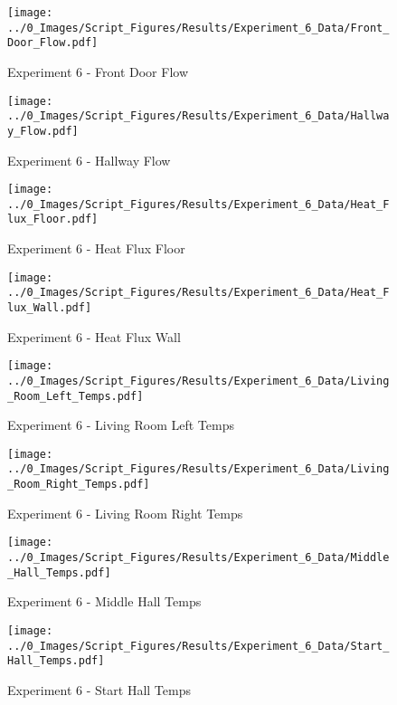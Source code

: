 	\clearpage

	\begin{figure}[H]
		\centering
		\texttt{[image: ../0\_Images/Script\_Figures/Results/Experiment\_6\_Data/Front\_Door\_Flow.pdf]}
		\caption[]{Experiment 6 - Front Door Flow}
	\end{figure}
 

	\begin{figure}[H]
		\centering
		\texttt{[image: ../0\_Images/Script\_Figures/Results/Experiment\_6\_Data/Hallway\_Flow.pdf]}
		\caption[]{Experiment 6 - Hallway Flow}
	\end{figure}
 
	\clearpage

	\begin{figure}[H]
		\centering
		\texttt{[image: ../0\_Images/Script\_Figures/Results/Experiment\_6\_Data/Heat\_Flux\_Floor.pdf]}
		\caption[]{Experiment 6 - Heat Flux Floor}
	\end{figure}
 

	\begin{figure}[H]
		\centering
		\texttt{[image: ../0\_Images/Script\_Figures/Results/Experiment\_6\_Data/Heat\_Flux\_Wall.pdf]}
		\caption[]{Experiment 6 - Heat Flux Wall}
	\end{figure}
 
	\clearpage

	\begin{figure}[H]
		\centering
		\texttt{[image: ../0\_Images/Script\_Figures/Results/Experiment\_6\_Data/Living\_Room\_Left\_Temps.pdf]}
		\caption[]{Experiment 6 - Living Room Left Temps}
	\end{figure}
 

	\begin{figure}[H]
		\centering
		\texttt{[image: ../0\_Images/Script\_Figures/Results/Experiment\_6\_Data/Living\_Room\_Right\_Temps.pdf]}
		\caption[]{Experiment 6 - Living Room Right Temps}
	\end{figure}
 
	\clearpage

	\begin{figure}[H]
		\centering
		\texttt{[image: ../0\_Images/Script\_Figures/Results/Experiment\_6\_Data/Middle\_Hall\_Temps.pdf]}
		\caption[]{Experiment 6 - Middle Hall Temps}
	\end{figure}
 

	\begin{figure}[H]
		\centering
		\texttt{[image: ../0\_Images/Script\_Figures/Results/Experiment\_6\_Data/Start\_Hall\_Temps.pdf]}
		\caption[]{Experiment 6 - Start Hall Temps}
	\end{figure}
 
